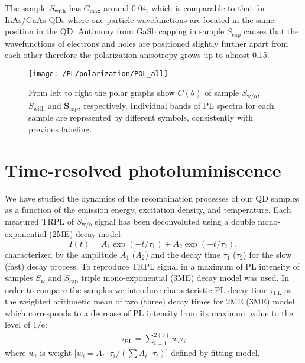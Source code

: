   The sample ${S_\mathrm{with}}$ has $C_\mathrm{max}$ around 0.04, which is comparable to that for InAs/GaAs QDs where one-particle wavefunctions are located in the same position in the QD. Antimony from GaSb capping in sample ${S_\mathrm{cap}}$ causes that the wavefunctions of electrons and holes are positioned slightly further apart from each other therefore the polarization anisotropy grows up to almost 0.15.
  
\begin{figure}
	\centering
	\texttt{[image: /PL/polarization/POL\_all]}
	\caption{From left to right the polar graphs show $C(\theta)$ of sample ${S_\mathrm{w/o}}$, ${S_\mathrm{with}}$ and $\mathbf{S_\mathrm{cap}}$, respectively. Individual bands of PL spectra for each sample are represented by different symbols, consistently with previous labeling.}
	\label{fig:PL_pol_all}
\end{figure}

\newpage
\section{Time-resolved photoluminiscence}
We have studied the dynamics of the recombination processes of our QD samples as a function of the emission energy, excitation density, and temperature. Each measured TRPL of $S_\mathrm{w/o}$ signal has been deconvoluted using a double mono-exponential (2ME) decay model
%
\begin{equation}
I(t)=A_1\exp(-t/\tau_1)+A_2\exp(-t/\tau_2),
\end{equation}
 characterized by the amplitude $A_1$ ($A_2$) and the decay time $\tau_1$ ($\tau_2$) for the slow (fast) decay process.
 To reproduce TRPL signal in a maximum of PL intensity of samples $S_\mathrm{w}$ and $S_\mathrm{cap}$ triple mono-exponential (3ME) decay model was used.
 In order to compare the samples we introduce characteristic PL decay time $\tau_\mathrm{PL}$ as the weighted arithmetic mean of two (three) decay times for 2ME (3ME) model which corresponds to a decrease of PL intensity from its maximum value to the level of $1/\mathrm{e}$:
%
\begin{eqnarray}
\tau_\mathrm{PL}=\sum_{i=1}^{2 ( 3) } w_i\tau_i \label{eq:average_time}
\end{eqnarray}
%
where $w_i$ is weight [$w_i={A_i\cdot \tau_i }/{(\sum A_i \cdot \tau_i)}$] defined by fitting model.

